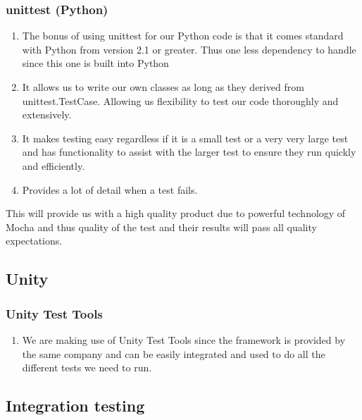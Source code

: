 \documentclass{article}
\begin{document}
		\subsubsection{unittest (Python)}
			\begin{enumerate}
				\item The bonus of using unittest for our Python code is that it comes standard with Python from version 2.1 or greater. Thus one less dependency to handle since this one is built into Python
				\item It allows us to write our own classes as long as they derived from unittest.TestCase. Allowing us flexibility to test our code thoroughly and extensively.
				\item It makes testing easy regardless if it is a small test or a very very large test and has functionality to assist with the larger test to ensure they run quickly and efficiently.
				\item Provides a lot of detail when a test fails.
			\end{enumerate}
			\noindent
			This will provide us with a high quality product due to powerful technology of Mocha and thus quality of the test and their results will pass all quality expectations.
	\subsection{Unity}
		\subsubsection{Unity Test Tools}
			\begin{enumerate}
				\item We are making use of Unity Test Tools since the framework is provided by the same company and can be easily integrated and used to do all the different tests we need to run.
			\end{enumerate}

	\subsection{Integration testing}
\end{document}
